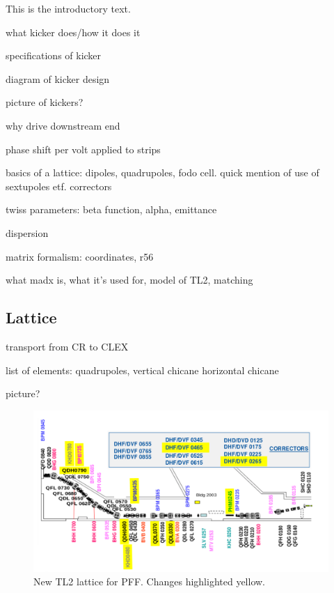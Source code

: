 
This is the introductory text.


what kicker does/how it does it

specifications of kicker

diagram of kicker design

picture of kickers?

why drive downstream end

phase shift per volt applied to strips


basics of a lattice: dipoles, quadrupoles, fodo cell. quick mention of use of sextupoles etf. correctors

twiss parameters: beta function, alpha, emittance

dispersion

matrix formalism: coordinates, r56


what madx is, what it's used for, model of TL2, matching


\subsection{Lattice}
\label{ss:tl2Lattice}

transport from CR to CLEX

list of elements: quadrupoles, vertical chicane horizontal chicane

picture?

\begin{landscape}
\begin{figure}
  \centering
  \includegraphics[width=\hsize]{Figures/newTL2Lattice}
  \caption{New TL2 lattice for PFF. Changes highlighted yellow.}
  \label{f:newTL2Lattice}
\end{figure}
\end{landscape}

